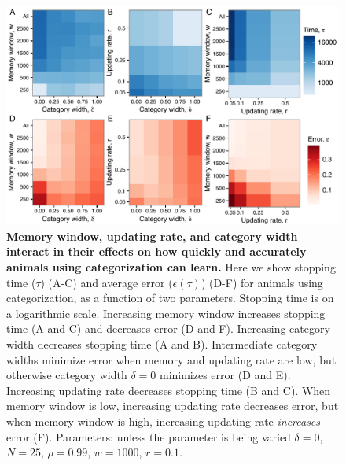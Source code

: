 \begin{figure}[ht]
\includegraphics[width=6.85in]{figures/parameters_interactions_full.pdf}
\caption{\sffamily\small\textbf{Memory window, updating rate, and category width interact in their effects on how quickly and accurately animals using categorization can learn.}
Here we show stopping time ($\tau$) (A-C) and average error ($\epsilon(\tau)$) (D-F) for animals using categorization, as a function of two parameters. Stopping time is on a logarithmic scale. Increasing memory window increases stopping time (A and C) and decreases error (D and F). Increasing category width decreases stopping time (A and B). Intermediate category widths minimize error when memory and updating rate are low, but otherwise category width $\delta=0$ minimizes error (D and E). Increasing updating rate decreases stopping time (B and C). When memory window is low, increasing updating rate decreases error, but when memory window is high, increasing updating rate \emph{increases} error (F). Parameters: unless the parameter is being varied $\delta = 0$, $N=25$, $\rho=0.99$, $w=1000$, $r=0.1$. 
}
\label{interactions}
\end{figure}

